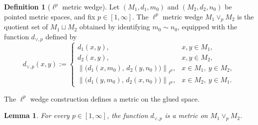 \documentclass[11pt]{amsart}
\newtheorem{lemma}[theorem]{Lemma}
\theoremstyle{definition}
\newtheorem{definition}[theorem]{Definition}
\theoremstyle{remark}
\newcommand{\1}{\mathbbm{1}}
\newcommand{\norm}[1]{\left\lVert #1\right\rVert}
\begin{document}
\begin{definition}[\texorpdfstring{$\ell^p$}{lp} metric wedge]\label{def:lp-wedge}
Let $(M_1,d_1,m_0)$ and $(M_2,d_2,n_0)$ be pointed metric spaces, and fix $p\in[1,\infty]$.
The $\ell^p$ metric wedge $M_1\vee_p M_2$ is the quotient set of $M_1\sqcup M_2$ obtained by identifying
$m_0\sim n_0$, equipped with the function $d_{\vee,p}$ defined by
\[
d_{\vee,p}(x,y):=
\begin{cases}
d_1(x,y), & x,y\in M_1,\\[1mm]
d_2(x,y), & x,y\in M_2,\\[1mm]
\norm{\bigl(d_1(x,m_0),\,d_2(y,n_0)\bigr)}_{\ell^p}, & x\in M_1,\ y\in M_2,\\[1mm]
\norm{\bigl(d_1(y,m_0),\,d_2(x,n_0)\bigr)}_{\ell^p}, & x\in M_2,\ y\in M_1.
\end{cases}
\]
\end{definition}
The $\ell^p$ wedge construction defines a metric on the glued space.
\begin{lemma}\label{lem:lp-wedge-metric}
For every $p\in[1,\infty]$, the function $d_{\vee,p}$ is a metric on $M_1\vee_p M_2$.
\end{lemma}
\end{document}
